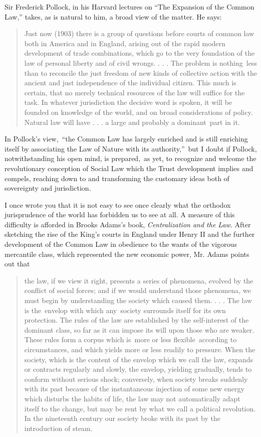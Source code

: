 \documentclass[openany,nobib]{tufte-book}
\begin{document}
Sir Frederick Pollock, in his Harvard lectures on \textquotesingle``The
Expansion of the Common Law,'' takes, as is natural to him, a broad view
of the matter. He says:~

\begin{quote}
Just now (1903) there is a group of questions before courts of common
law both in America and in England, arising out of the rapid modern
development of trade combinations, which go to the very foundation of
the law of personal liberty and of civil wrongs. . . . The problem is
nothing~less than to reconcile the just freedom of new kinds of
collective action with the ancient and just independence of the
individual citizen. This much is certain, that no merely technical
resources of the law will suffice for the task. In whatever jurisdiction
the decisive word is spoken, it will be founded on knowledge of the
world, and on broad considerations of policy. Natural law will have . .
. a large and probably a dominant~part in it.
\end{quote}

In Pollock's view,~``the Common Law has largely enriched and is still
enriching itself by associating the Law of Nature with its
authority,''~but I doubt if Pollock, notwithstanding his open mind, is
prepared,~as yet, to recognize and welcome the revolutionary conception
of Social Law which the Trust development implies and compels, reaching
down to and transforming the customary ideas both of sovereignty and
jurisdiction.~

I once wrote you that it is not easy to see once clearly what the
orthodox jurisprudence of the world has forbidden us to see at all. A
measure of this difficulty is afforded in Brooks Adams's book,
\emph{Centralization and the Law}. After sketching the rise of the
King's courts in England under Henry II and the further development of
the Common Law in obedience to the wants of the vigorous mercantile
class, which represented the new economic power, Mr. Adams points out
that~

\newpage\begin{quote}
the law, if we view it right, presents a series of phenomena, evolved by
the conflict of social forces; and if we would understand those
phenomena, we must begin by understanding the society which caused them.
. . . The law is the~envelop with which any~society surrounds itself for
its own protection. The rules of the law are established by the
self-interest of the dominant class, so far as it can impose its will
upon those who are weaker. These rules form a corpus which is~more or
less flexible~according to circumstances, and which yields more or less
readily to pressure. When the society, which is the content of the
envelop which we call the law, expands or contracts regularly and
slowly, the envelop, yielding gradually, tends to conform without
serious shock; conversely, when society breaks suddenly with its past
because of the instantaneous injection of some new energy which disturbs
the habits of life, the law may not automatically adapt itself to the
change, but may be rent by what we call a political revolution. In the
nineteenth century our society broke with its past by the introduction
of steam.~
\end{quote}
\end{document}
